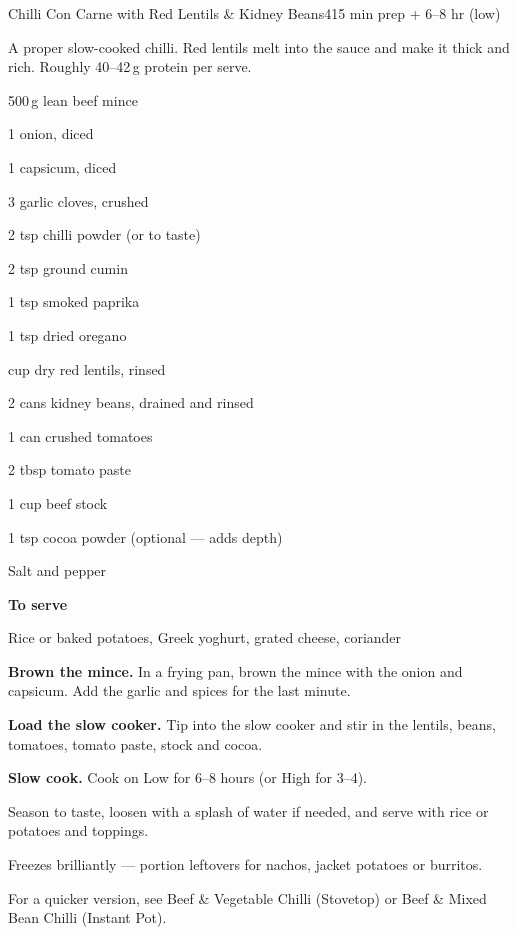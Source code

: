 \begin{recipebox}{Chilli Con Carne with Red Lentils \& Kidney Beans}{4}{15 min prep + 6--8 hr (low)}

A proper slow-cooked chilli. Red lentils melt into the sauce and make it thick
and rich. Roughly 40--42\,g protein per serve.

\begin{ingredients}
  \item 500\,g lean beef mince
  \item 1 onion, diced
  \item 1 capsicum, diced
  \item 3 garlic cloves, crushed
  \item 2 tsp chilli powder (or to taste)
  \item 2 tsp ground cumin
  \item 1 tsp smoked paprika
  \item 1 tsp dried oregano
  \item {} cup dry red lentils, rinsed
  \item 2 cans kidney beans, drained and rinsed
  \item 1 can crushed tomatoes
  \item 2 tbsp tomato paste
  \item 1 cup beef stock
  \item 1 tsp cocoa powder (optional --- adds depth)
  \item Salt and pepper
  \item[] \textbf{To serve}
  \item Rice or baked potatoes, Greek yoghurt, grated cheese, coriander
\end{ingredients}

\begin{method}
  \item \textbf{Brown the mince.} In a frying pan, brown the mince with the onion and capsicum. Add the garlic and spices for the last minute.
  \item \textbf{Load the slow cooker.} Tip into the slow cooker and stir in the lentils, beans, tomatoes, tomato paste, stock and cocoa.
  \item \textbf{Slow cook.} Cook on Low for 6--8 hours (or High for 3--4).
  \item Season to taste, loosen with a splash of water if needed, and serve with rice or potatoes and toppings.
\end{method}

\begin{notelist}
  \item Freezes brilliantly --- portion leftovers for nachos, jacket potatoes or burritos.
  \item For a quicker version, see Beef \& Vegetable Chilli (Stovetop) or Beef \& Mixed Bean Chilli (Instant Pot).
\end{notelist}

\end{recipebox}
